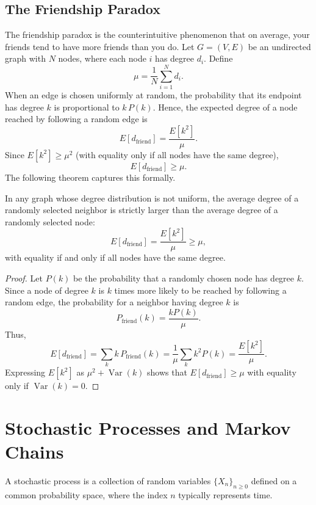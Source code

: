 \documentclass[10pt, headings=standardclasses, parskip=half, twoside]{scrartcl}
\renewcommand{\emph}[1]{\textcolor{mypurple}{#1}}
\newcommand{\Var}{\operatorname{Var}}
\begin{document}
\subsection{The Friendship Paradox}\label{subsec:friendship}
The friendship paradox is the counterintuitive phenomenon that on average, your friends tend to have more friends than you do. Let \(G=(V,E)\) be an undirected graph with \(N\) nodes, where each node \(i\) has degree \(d_i\). Define
\[
\mu=\frac{1}{N}\sum_{i=1}^N d_i.
\]
When an edge is chosen uniformly at random, the probability that its endpoint has degree \(k\) is proportional to \(k\,P(k)\). Hence, the expected degree of a node reached by following a random edge is
\[
E[d_{\mathrm{friend}}]=\frac{E[k^2]}{\mu}.
\]
Since \(E[k^2]\ge \mu^2\) (with equality only if all nodes have the same degree),
\[
E[d_{\mathrm{friend}}]\ge \mu.
\]
The following theorem captures this formally.

\begin{theorem}\label{thm:friendship}
In any graph whose degree distribution is not uniform, the average degree of a randomly selected neighbor is strictly larger than the average degree of a randomly selected node:
\[
E[d_{\mathrm{friend}}]=\frac{E[k^2]}{\mu}\ge \mu,
\]
with equality if and only if all nodes have the same degree.
\end{theorem}

\begin{proof}
Let \(P(k)\) be the probability that a randomly chosen node has degree \(k\). Since a node of degree \(k\) is \(k\) times more likely to be reached by following a random edge, the probability for a neighbor having degree \(k\) is
\[
P_{\mathrm{friend}}(k)=\frac{kP(k)}{\mu}.
\]
Thus,
\[
E[d_{\mathrm{friend}}]=\sum_{k} k\,P_{\mathrm{friend}}(k)=\frac{1}{\mu}\sum_{k} k^2 P(k)=\frac{E[k^2]}{\mu}.
\]
Expressing \(E[k^2]\) as \(\mu^2+\Var(k)\) shows that \(E[d_{\mathrm{friend}}]\ge \mu\) with equality only if \(\Var(k)=0\).
\end{proof}


















\section{Stochastic Processes and Markov Chains}\label{sec:markov}
\begin{definition}\label{def:stochastic}
A \emph{stochastic process} is a collection of random variables \(\{X_n\}_{n\ge0}\) defined on a common probability space, where the index \(n\) typically represents time.
\end{definition}
\end{document}
